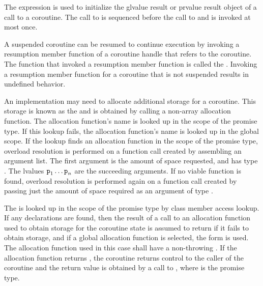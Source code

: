 \pnum
The expression  is used
to initialize
the glvalue result or prvalue result object of a call to a coroutine.
The call to 
is sequenced before
the call to 
and is invoked at most once.

\pnum
A suspended coroutine can be resumed to continue execution by invoking
a resumption member function
of a coroutine handle
that refers to the coroutine.
The function that invoked a resumption member function is
called the .
Invoking a resumption member function for a coroutine
that is not suspended results in undefined behavior.

\pnum
An implementation may need to allocate additional storage for a coroutine.
This storage is known as the  and is obtained by calling
a non-array allocation function.
The allocation function's name is looked up in the scope of the promise type.
If this lookup fails, the allocation function's name is looked up in the
global scope.
If the lookup finds an allocation function in the scope of the promise type,
overload resolution is performed on a function call created by assembling an
argument list. The first argument is the amount of space requested, and has
type .
The lvalues $\texttt{p}_1 \dotsc \texttt{p}_n$ are the succeeding arguments.
If no viable function is found,
overload resolution is performed again
on a function call created by passing just
the amount of space required as an argument of type .

\pnum
The  
is looked up in the scope of the promise type by class member access
lookup.
If any declarations are found, then the result
of a call to an allocation function used to obtain storage for the coroutine
state is assumed to return  if it fails to obtain storage,
and if a global allocation function is selected,
the  form is used.
The allocation function used in this case shall have a non-throwing
.
If the allocation function returns , the coroutine returns
control to the caller of the coroutine and the return value is obtained by a
call to , where 
is the promise type.

